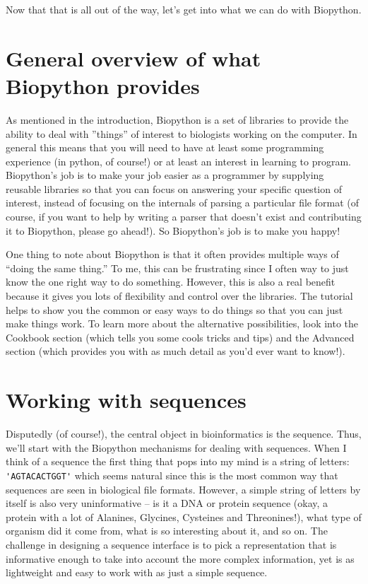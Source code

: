 \documentclass{report}
\begin{document}
Now that that is all out of the way, let's get into what we can do with Biopython.

\section{General overview of what Biopython provides}

As mentioned in the introduction, Biopython is a set of libraries to provide the ability to deal with ''things'' of interest to biologists working on the computer. In general this means that you will need to have at least some programming experience (in python, of course!) or at least an interest in learning to program. Biopython's job is to make your job easier as a programmer by supplying reusable libraries so that you can focus on answering your specific question of interest, instead of focusing on the internals of parsing a particular file format (of course, if you want to help by writing a parser that doesn't exist and contributing it to Biopython, please go ahead!). So Biopython's job is to make you happy!


One thing to note about Biopython is that it often provides multiple ways of ``doing the same thing.'' To me, this can be frustrating since I often way to just know the one right way to do something. However, this is also a real benefit because it gives you lots of flexibility and control over the libraries. The tutorial helps to show you the common or easy ways to do things so that you can just make things work. To learn more about the alternative possibilities, look into the Cookbook section (which tells you some cools tricks and tips) and the Advanced section (which provides you with as much detail as you'd ever want to know!). 

\section{Working with sequences}
\label{sec:sequences}

Disputedly (of course!), the central object in bioinformatics is the sequence. Thus, we'll start with the Biopython mechanisms for dealing with sequences. When I think of a sequence the first thing that pops into my mind is a string of letters:\verb| 'AGTACACTGGT'| which seems natural since this is the most common way that sequences are seen in biological file formats.  However, a simple string of letters by itself is also very uninformative -- is it a DNA or  protein sequence (okay, a protein with a lot of Alanines, Glycines, Cysteines and Threonines!), what type of organism did it come from, what is so interesting about it, and so on. The challenge in designing a sequence interface is to pick a representation that is informative enough to take into account the more complex information, yet is as lightweight and easy to work with as just a simple sequence.
\end{document}
